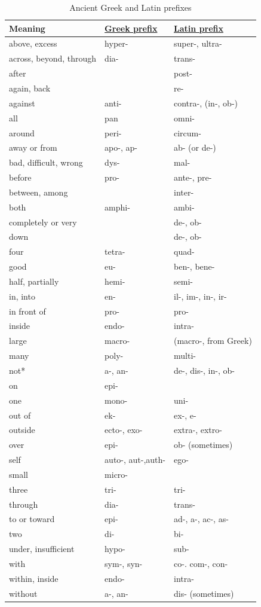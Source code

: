 \documentclass[a4paper,14pt,oneside]{book}
\begin{document}
\begin{table}[htbp]
\caption{\label{tab--ancient-greek-latin-prefixes}Ancient Greek and Latin prefixes}
\centering
\begin{tabu} spread \linewidth {lll}
\toprule
Meaning & \hyperref[orgae5cf93]{Greek prefix} & \hyperref[orgbac7301]{Latin prefix}\\
\midrule
above, excess & hyper- & super-, ultra-\\
across, beyond, through & dia- & trans-\\
after &  & post-\\
again, back &  & re-\\
against & anti- & contra-, (in-, ob-)\\
all & pan & omni-\\
around & peri- & circum-\\
away or from & apo-, ap- & ab- (or de-)\\
bad, difficult, wrong & dys- & mal-\\
before & pro- & ante-, pre-\\
between, among &  & inter-\\
both & amphi- & ambi-\\
completely or very &  & de-, ob-\\
down &  & de-, ob-\\
four & tetra- & quad-\\
good & eu- & ben-, bene-\\
half, partially & hemi- & semi-\\
in, into & en- & il-, im-, in-, ir-\\
in front of & pro- & pro-\\
inside & endo- & intra-\\
large & macro- & (macro-, from Greek)\\
many & poly- & multi-\\
not* & a-, an- & de-, dis-, in-, ob-\\
on & epi- & \\
one & mono- & uni-\\
out of & ek- & ex-, e-\\
outside & ecto-, exo- & extra-, extro-\\
over & epi- & ob- (sometimes)\\
self & auto-, aut-,auth- & ego-\\
small & micro- & \\
three & tri- & tri-\\
through & dia- & trans-\\
to or toward & epi- & ad-, a-, ac-, as-\\
two & di- & bi-\\
under, insufficient & hypo- & sub-\\
with & sym-, syn- & co-. com-, con-\\
within, inside & endo- & intra-\\
without & a-, an- & dis- (sometimes)\\
\bottomrule
\end{tabu}
\end{table}
\end{document}
